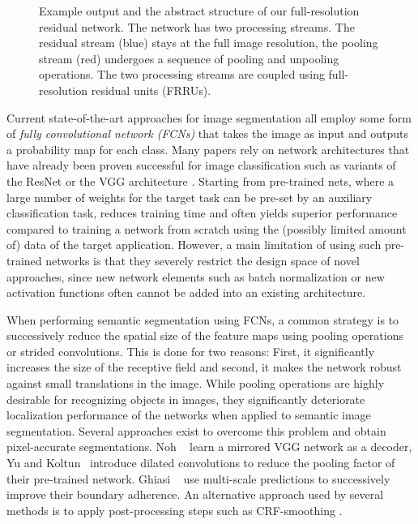 \documentclass[10pt,twocolumn,letterpaper]{article}
\begin{document}
\begin{figure}[t]
{}
\caption{
Example output and the abstract structure of our full-resolution residual network.
The network has two processing streams.
The residual stream (blue) stays at the full image resolution, the pooling stream (red) undergoes a sequence of pooling and unpooling operations.
The two processing streams are coupled using full-resolution residual units (FRRUs).
}
\label{fig:overview}
\vspace{-3pt}
\end{figure}




Current state-of-the-art approaches for image segmentation all employ some form of \emph{fully convolutional network (FCNs)} \cite{Long15CVPR} that takes the image as input and outputs a probability map for each class. Many papers rely on network architectures that have already been proven successful for image classification such as variants of the ResNet \cite{He16CVPR} or the VGG architecture \cite{Simonyan15ICLR}.
Starting from pre-trained nets, where a large number of weights for the target task can be pre-set by an auxiliary classification task, reduces training time and often yields superior performance compared to training a network from scratch using the (possibly limited amount of) data of the target application.
However, a main limitation of using such pre-trained networks is that they severely restrict the design space of novel approaches,
since new network elements such as batch normalization \cite{Ioffe15ICML} or new activation functions often cannot be added into an existing architecture.

When performing semantic segmentation using FCNs, a common strategy is to successively reduce the spatial size of the feature maps using pooling operations or strided convolutions.
This is done for two reasons: First, it significantly increases the size of the receptive field and second, it makes the network robust against small translations in the image.
While pooling operations are highly desirable for recognizing objects in images, they significantly deteriorate localization performance of the networks when applied to semantic image segmentation.
Several approaches exist to overcome this problem and obtain pixel-accurate segmentations.
Noh \etal~\cite{Noh15ICCV} learn a mirrored VGG network as a decoder, Yu and Koltun~\cite{Yu16ICLR} introduce dilated convolutions to reduce the pooling factor of their pre-trained network. Ghiasi \etal~\cite{Ghiasi16ECCV} use multi-scale predictions to successively improve their boundary adherence.
An alternative approach used by several methods is to apply post-processing steps such as CRF-smoothing \cite{Krahenbuhl11NIPS}.
\end{document}
